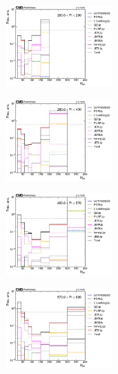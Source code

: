 \begin{figure}[ht!]
  \centering
  \begin{subfigure}
    \centering
    \includegraphics[width=0.45\textwidth]{figures/multijet/unfolding/dijet/unfolded_fracUnc_ungroomed_0.pdf}
\end{subfigure}
  \begin{subfigure}
    \centering
    \includegraphics[width=0.45\textwidth]{figures/multijet/unfolding/dijet/unfolded_fracUnc_ungroomed_1.pdf}
\end{subfigure}
  \begin{subfigure}
    \centering
    \includegraphics[width=0.45\textwidth]{figures/multijet/unfolding/dijet/unfolded_fracUnc_ungroomed_2.pdf}
\end{subfigure}
\begin{subfigure}
    \centering
    \includegraphics[width=0.45\textwidth]{figures/multijet/unfolding/dijet/unfolded_fracUnc_ungroomed_3.pdf}

\end{subfigure}
\end{figure}
